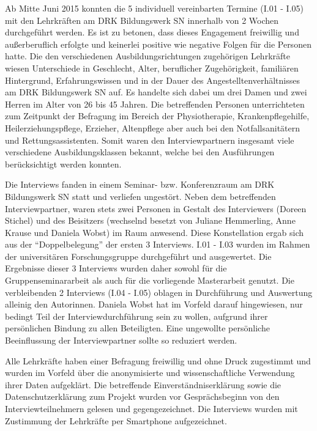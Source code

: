 Ab Mitte Juni 2015 konnten die 5 individuell vereinbarten Termine (I.01 - I.05) mit den Lehrkräften am DRK Bildungswerk SN innerhalb von 2 Wochen durchgeführt werden. Es ist zu betonen, dass dieses Engagement freiwillig und außerberuflich erfolgte und keinerlei positive wie negative Folgen für die Personen hatte. Die den verschiedenen Ausbildungsrichtungen zugehörigen Lehrkräfte wiesen Unterschiede in Geschlecht, Alter, beruflicher Zugehörigkeit, familiären Hintergrund, Erfahrungswissen und in der Dauer des Angestelltenverhältnisses am DRK Bildungswerk SN auf. Es handelte sich dabei um drei Damen und zwei Herren im Alter von 26 bis 45 Jahren. Die betreffenden Personen unterrichteten zum Zeitpunkt der Befragung im Bereich der Physiotherapie, Krankenpflegehilfe, Heilerziehungspflege, Erzieher, Altenpflege aber auch bei den Notfallsanitätern und Rettungsassistenten. Somit waren den Interviewpartnern insgesamt viele verschiedene Ausbildungsklassen bekannt, welche bei den Ausführungen berücksichtigt werden konnten.

Die Interviews fanden in einem Seminar- bzw. Konferenzraum am DRK Bildungswerk SN statt und verliefen ungestört.
Neben dem betreffenden Interviewpartner, waren stets zwei Personen in Gestalt des Interviewers (Doreen Stichel) und des Beisitzers (wechselnd besetzt von Juliane Hemmerling, Anne Krause und Daniela Wobst) im Raum anwesend. Diese Konstellation ergab sich aus der "`Doppelbelegung"' der ersten 3 Interviews. I.01 - I.03 wurden im Rahmen der universitären Forschungsgruppe durchgeführt und ausgewertet. Die Ergebnisse dieser 3 Interviews wurden daher sowohl für die Gruppenseminararbeit als auch für die vorliegende Masterarbeit genutzt. Die verbleibenden 2 Interviews (I.04 - I.05) oblagen in Durchführung und Auswertung alleinig den Autorinnen. Daniela Wobst hat im Vorfeld darauf hingewiesen, nur bedingt Teil der Interviewdurchführung sein zu wollen, aufgrund ihrer persönlichen Bindung zu allen Beteiligten. Eine ungewollte persönliche Beeinflussung der Interviewpartner sollte so reduziert werden.

Alle Lehrkräfte haben einer Befragung freiwillig und ohne Druck zugestimmt und wurden im Vorfeld über die anonymisierte und wissenschaftliche Verwendung ihrer Daten aufgeklärt. Die betreffende Einverständniserklärung sowie die Datenschutzerklärung zum Projekt wurden vor Gesprächsbeginn von den Interviewteilnehmern gelesen und gegengezeichnet. Die Interviews wurden mit Zustimmung der Lehrkräfte per Smartphone aufgezeichnet. 

